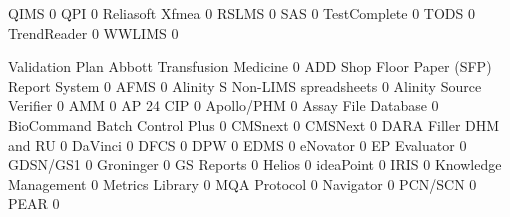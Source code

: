 \documentclass{article}
\begin{document}
\begin{Schunk}
\begin{Soutput}
  QIMS                                                                    0
  QPI                                                                     0
  Reliasoft Xfmea                                                         0
  RSLMS                                                                   0
  SAS                                                                     0
  TestComplete                                                            0
  TODS                                                                    0
  TrendReader                                                             0
  WWLIMS                                                                  0
                                          
                                           Validation Plan
  Abbott Transfusion Medicine                            0
  ADD Shop Floor Paper (SFP) Report System               0
  AFMS                                                   0
  Alinity S Non-LIMS spreadsheets                        0
  Alinity Source Verifier                                0
  AMM                                                    0
  AP 24 CIP                                              0
  Apollo/PHM                                             0
  Assay File Database                                    0
  BioCommand Batch Control Plus                          0
  CMSnext                                                0
  CMSNext                                                0
  DARA Filler DHM and RU                                 0
  DaVinci                                                0
  DFCS                                                   0
  DPW                                                    0
  EDMS                                                   0
  eNovator                                               0
  EP Evaluator                                           0
  GDSN/GS1                                               0
  Groninger                                              0
  GS Reports                                             0
  Helios                                                 0
  ideaPoint                                              0
  IRIS                                                   0
  Knowledge Management                                   0
  Metrics Library                                        0
  MQA Protocol                                           0
  Navigator                                              0
  PCN/SCN                                                0
  PEAR                                                   0

\end{Soutput}
\end{Schunk}
\end{document}
